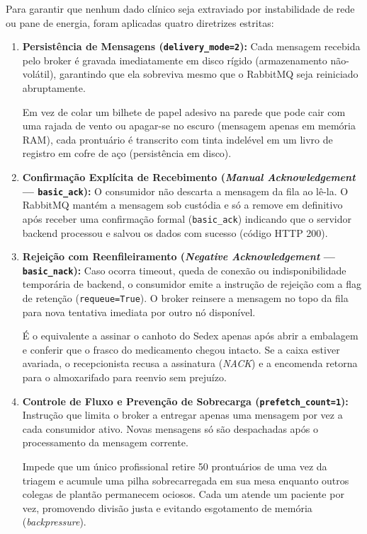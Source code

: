 \documentclass[11pt,a4paper]{article}
\begin{document}
Para garantir que nenhum dado clínico seja extraviado por instabilidade de rede ou pane de energia, foram aplicadas quatro diretrizes estritas:

\begin{enumerate}
    \item \textbf{Persistência de Mensagens (\texttt{delivery\_mode=2}):} Cada mensagem recebida pelo broker é gravada imediatamente em disco rígido (armazenamento não-volátil), garantindo que ela sobreviva mesmo que o RabbitMQ seja reiniciado abruptamente.
    \begin{analogia}
    Em vez de colar um bilhete de papel adesivo na parede que pode cair com uma rajada de vento ou apagar-se no escuro (mensagem apenas em memória RAM), cada prontuário é transcrito com tinta indelével em um livro de registro em cofre de aço (persistência em disco).
    \end{analogia}

    \item \textbf{Confirmação Explícita de Recebimento (\textit{Manual Acknowledgement} — \texttt{basic\_ack}):} O consumidor não descarta a mensagem da fila ao lê-la. O RabbitMQ mantém a mensagem sob custódia e só a remove em definitivo após receber uma confirmação formal (\texttt{basic\_ack}) indicando que o servidor backend processou e salvou os dados com sucesso (código HTTP 200).

    \item \textbf{Rejeição com Reenfileiramento (\textit{Negative Acknowledgement} — \texttt{basic\_nack}):} Caso ocorra timeout, queda de conexão ou indisponibilidade temporária de backend, o consumidor emite a instrução de rejeição com a flag de retenção (\texttt{requeue=True}). O broker reinsere a mensagem no topo da fila para nova tentativa imediata por outro nó disponível.
    \begin{analogia}
    É o equivalente a assinar o canhoto do Sedex apenas após abrir a embalagem e conferir que o frasco do medicamento chegou intacto. Se a caixa estiver avariada, o recepcionista recusa a assinatura (\textit{NACK}) e a encomenda retorna para o almoxarifado para reenvio sem prejuízo.
    \end{analogia}

    \item \textbf{Controle de Fluxo e Prevenção de Sobrecarga (\texttt{prefetch\_count=1}):} Instrução que limita o broker a entregar apenas uma mensagem por vez a cada consumidor ativo. Novas mensagens só são despachadas após o processamento da mensagem corrente.
    \begin{analogia}
    Impede que um único profissional retire 50 prontuários de uma vez da triagem e acumule uma pilha sobrecarregada em sua mesa enquanto outros colegas de plantão permanecem ociosos. Cada um atende um paciente por vez, promovendo divisão justa e evitando esgotamento de memória (\textit{backpressure}).
    \end{analogia}
\end{enumerate}
\end{document}
